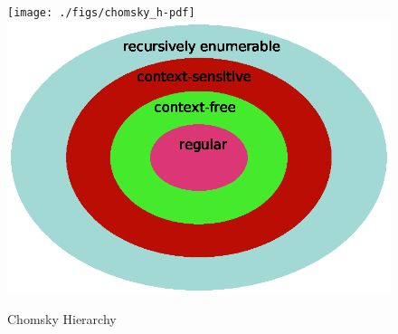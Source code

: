 \begin{figure}
	\begin{minipage}[t]{\textwidth}
		\ifpdf
		\texttt{[image: ./figs/chomsky\_h-pdf]}
		\else
		\includegraphics[width=\linewidth,keepaspectratio=true]{./figs/chomsky_h-eps}
		\fi
		\caption{\small Chomsky Hierarchy}
		\label{mtv:ch}
	\end{minipage}
\end{figure}

